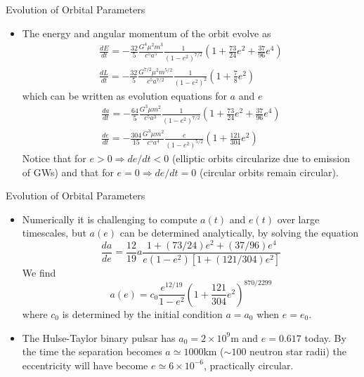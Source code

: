 \documentclass[size=11pt,style=paintings]{powerdot}
\begin{document}
  \begin{slide}{Evolution of Orbital Parameters}
 \begin{itemize}
 \item The energy and angular momentum of the orbit evolve as
 $$
\begin{array}{l}{\frac{d E}{d t}=-\frac{32}{5} \frac{G^{4} \mu^{2} m^{3}}{c^{5} a^{5}} \frac{1}{\left(1-e^{2}\right)^{7 / 2}}\left(1+\frac{73}{24} e^{2}+\frac{37}{96} e^{4}\right)} \\ {\frac{d L}{d t}=-\frac{32}{5} \frac{G^{7 / 2} \mu^{2} m^{5 / 2}}{c^{5} a^{7 / 2}} \frac{1}{\left(1-e^{2}\right)^{2}}\left(1+\frac{7}{8} e^{2}\right)}\end{array}
$$
which can be written as evolution equations for $a$ and $e$
$$
\begin{array}{l}{\frac{d a}{d t}=-\frac{64}{5} \frac{G^{3} \mu m^{2}}{c^{5} a^{3}} \frac{1}{\left(1-e^{2}\right)^{7 / 2}}\left(1+\frac{73}{24} e^{2}+\frac{37}{96} e^{4}\right)} \\ {\frac{d e}{d t}=-\frac{304}{15} \frac{G^{3} \mu m^{2}}{c^{5} a^{4}} \frac{e}{\left(1-e^{2}\right)^{5 / 2}}\left(1+\frac{121}{304} e^{2}\right)}\end{array}
$$
Notice that for $e>0 \Rightarrow de/dt<0$ (elliptic orbits circularize due to emission of GWs) and that for $e=0 \Rightarrow de/dt=0$ (circular orbits remain circular).
 \end{itemize}
 \end{slide}
 
  \begin{slide}{Evolution of Orbital Parameters}
 \begin{itemize}
 \item Numerically it is challenging to compute $a(t)$ and $e(t)$ over large timescales, but $a(e)$ can be determined analytically, by solving the equation
$$
\frac{d a}{d e}=\frac{12}{19} a \frac{1+(73 / 24) e^{2}+(37 / 96) e^{4}}{e\left(1-e^{2}\right)\left[1+(121 / 304) e^{2}\right]}
$$
We find
$$
\boxed{a(e)=c_{0} \frac{e^{12 / 19}}{1-e^{2}}\left(1+\frac{121}{304} e^{2}\right)^{870 / 2299}}
$$ 
where $c_0$ is determined by the initial condition $a=a_0$ when $e=e_0$.
\vskip 0.4cm
\item The Hulse-Taylor binary pulsar has $a_0=2\times 10^9$m and $e=0.617$ today. By the time the separation becomes $a\simeq1000$km ($\sim 100$ neutron star radii) the eccentricity will have become $e\simeq6\times10^{-6}$, practically circular.
\end{itemize}
 \end{slide}
 
\end{document}
